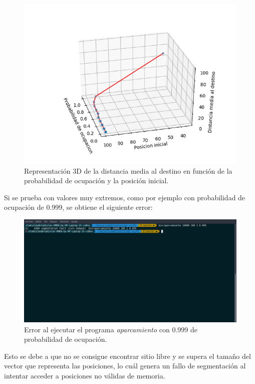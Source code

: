 \documentclass[11pt,a4paper]{report}
\begin{document}
\begin{figure}[H]
\centering
\includegraphics[scale=0.6]{img/aparc-prob-3d.png}
\caption{Representación 3D de la distancia media al destino en función de la probabilidad de ocupación y
la posición inicial.}
\label{aparc-3d-prob}
\end{figure}

Si se prueba con valores muy extremos, como por ejemplo con probabilidad de ocupación de 0.999, se obtiene el
siguiente error:

\begin{figure}[H]
\centering
\includegraphics[scale=0.3]{img/aparc-prob-error.png}
\caption{Error al ejecutar el programa \textit{aparcamiento} con 0.999 de probabilidad de ocupación.}
\end{figure}

Esto se debe a que no se consigue encontrar sitio libre y se supera el tamaño del vector que representa las posiciones,
lo cuál genera un fallo de segmentación al intentar acceder a posiciones no válidas de memoria.
\end{document}
